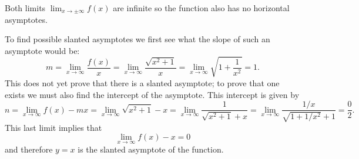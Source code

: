 Both limits $\lim_{x\to\pm\infty} f(x)$ are infinite so the function
also has no horizontal asymptotes.  

To find possible slanted asymptotes we first see what the slope of
such an asymptote would be:
\[
m
= \lim_{x\to\infty}\frac{f(x)}{x}
= \lim_{x\to\infty}\frac{\sqrt{x^2+1}}{x}
= \lim_{x\to\infty}\sqrt{1+\frac{1}{x^2}} = 1.
\]
This does not yet prove that there is a slanted asymptote; to prove
that one exists we must also find the intercept of the asymptote.
This intercept is given by
\[
n = \lim_{x\to\infty} f(x) - mx
=\lim_{x\to\infty} \sqrt{x^2+1} - x
  = \lim_{x\to\infty} \frac{1}{\sqrt{x^2+1} + x}
  = \lim_{x\to\infty} \frac{1/x}{\sqrt{1+1/x^2} + 1}
  = \dfrac{0}{2}.
\]
This last limit implies that
\[
\lim_{x\to\infty} f(x) - x = 0
\]
and therefore $y=x$ is the slanted asymptote of the function.

